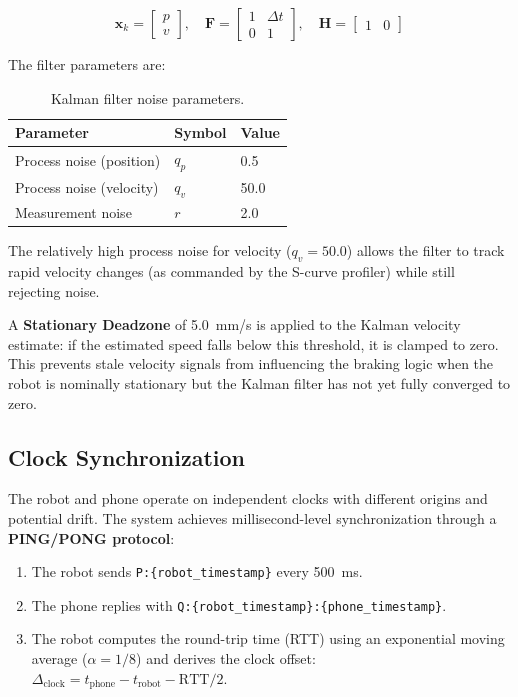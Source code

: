 \documentclass[12pt, a4paper, twoside]{article}
\begin{document}
\begin{equation}
    \mathbf{x}_k = \begin{bmatrix} p \\ v \end{bmatrix}, \quad
    \mathbf{F} = \begin{bmatrix} 1 & \Delta t \\ 0 & 1 \end{bmatrix}, \quad
    \mathbf{H} = \begin{bmatrix} 1 & 0 \end{bmatrix}
\end{equation}

The filter parameters are:

\begin{table}[H]
    \centering
    \caption{Kalman filter noise parameters.}
    \label{tab:kalman-params}
    \begin{tabular}{@{}lll@{}}
        \toprule
        \textbf{Parameter} & \textbf{Symbol} & \textbf{Value} \\
        \midrule
        Process noise (position) & $q_p$ & 0.5 \\
        Process noise (velocity) & $q_v$ & 50.0 \\
        Measurement noise        & $r$   & 2.0 \\
        \bottomrule
    \end{tabular}
\end{table}

The relatively high process noise for velocity ($q_v = 50.0$) allows the filter to track rapid velocity changes (as commanded by the S-curve profiler) while still rejecting noise.

A \textbf{Stationary Deadzone} of \SI{5.0}{mm/s} is applied to the Kalman velocity estimate: if the estimated speed falls below this threshold, it is clamped to zero. This prevents stale velocity signals from influencing the braking logic when the robot is nominally stationary but the Kalman filter has not yet fully converged to zero.

\subsection{Clock Synchronization}

The robot and phone operate on independent clocks with different origins and potential drift. The system achieves millisecond-level synchronization through a \textbf{PING/PONG protocol}:

\begin{enumerate}
    \item The robot sends \texttt{P:\{robot\_timestamp\}} every \SI{500}{\milli\second}.
    \item The phone replies with \texttt{Q:\{robot\_timestamp\}:\{phone\_timestamp\}}.
    \item The robot computes the round-trip time (RTT) using an exponential moving average ($\alpha = 1/8$) and derives the clock offset: $\Delta_{\text{clock}} = t_{\text{phone}} - t_{\text{robot}} - \text{RTT}/2$.
\end{enumerate}
\end{document}
